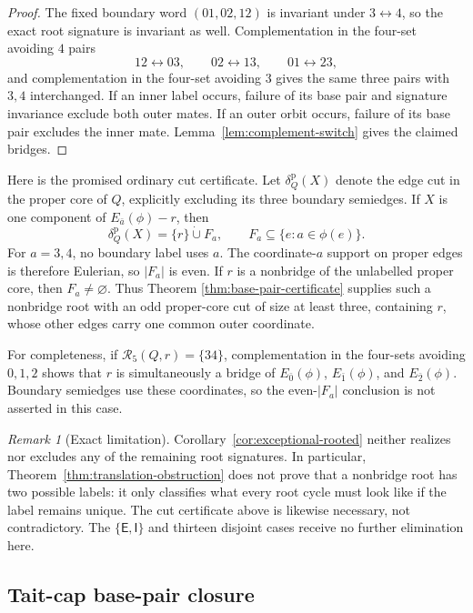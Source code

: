\documentclass[11pt]{article}
\theoremstyle{definition}
\theoremstyle{remark}
\newtheorem{remark}[theorem]{Remark}
\begin{document}
\begin{proof}
The fixed boundary word \((01,02,12)\) is invariant under
\(3\leftrightarrow4\), so the exact root signature is invariant as
well.  Complementation in the four-set avoiding \(4\) pairs
\[
 12\leftrightarrow03,\qquad
 02\leftrightarrow13,\qquad
 01\leftrightarrow23,
\]
and complementation in the four-set avoiding \(3\) gives the same
three pairs with \(3,4\) interchanged.  If an inner label occurs,
failure of its base pair and signature invariance exclude both outer
mates.  If an outer orbit occurs, failure of its base pair excludes
the inner mate.  Lemma~\ref{lem:complement-switch} gives the claimed
bridges.
\end{proof}

Here is the promised ordinary cut certificate.  Let
\(\delta_Q^{\mathrm p}(X)\) denote the edge cut in the proper core of
\(Q\), explicitly excluding its three boundary semiedges.  If \(X\)
is one component of \(E_{\bar a}(\phi)-r\), then
\[
 \delta_Q^{\mathrm p}(X)=\{r\}\mathbin{\dot\cup}F_a,
 \qquad F_a\subseteq\{e:a\in\phi(e)\}.
\]
For \(a=3,4\), no boundary label uses \(a\).  The coordinate-\(a\)
support on proper edges is therefore Eulerian, so \(|F_a|\) is even.
If \(r\) is a nonbridge of the unlabelled proper core, then
\(F_a\ne\varnothing\).  Thus Theorem
\ref{thm:base-pair-certificate} supplies such a nonbridge root with an
odd proper-core cut of size at least three, containing \(r\), whose
other edges carry one common outer coordinate.

For completeness, if \(\mathcal R_5(Q,r)=\{34\}\), complementation in
the four-sets avoiding \(0,1,2\) shows that \(r\) is simultaneously a
bridge of \(E_{\bar0}(\phi)\), \(E_{\bar1}(\phi)\), and
\(E_{\bar2}(\phi)\).  Boundary semiedges use these coordinates, so the
even-\(|F_a|\) conclusion is not asserted in this case.

\begin{remark}[Exact limitation]
Corollary~\ref{cor:exceptional-rooted} neither realizes nor excludes any
of the remaining root signatures.  In particular,
Theorem~\ref{thm:translation-obstruction} does not prove that a
nonbridge root has two possible labels: it only classifies what every
root cycle must look like if the label remains unique.  The cut
certificate above is likewise necessary, not contradictory.  The
\(\{\mathsf E,\mathsf I\}\) and thirteen disjoint cases receive no
further elimination here.
\end{remark}

\subsection{Tait-cap base-pair closure}
\end{document}
